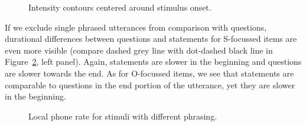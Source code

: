 \begin{figure}[!htbp]
\centering
{}
\caption{Intensity contours centered around stimulus onset.}
\label{fig405}\end{figure}

If we exclude single phrased utterances from comparison with questions, durational differences between questions and statements for S-focussed items are even more visible (compare dashed grey line with dot-dashed black line in Figure~\ref{fig406}, left panel). Again, statements are slower in the beginning and questions are slower towards the end. As for O-focussed items, we see that statements are comparable to questions in the end portion of the utterance, yet they are slower in the beginning. 

\begin{figure}[!htbp]
\centering
{}
\caption{Local phone rate for stimuli with different phrasing.}
\label{fig406}\end{figure}

